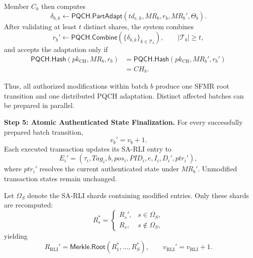 \documentclass[lettersize,journal]{IEEEtran}
\begin{document}
Member $C_k$ then computes
\begin{equation}
\delta_{b,k}
\leftarrow
\mathsf{PQCH.PartAdapt}
(td_{e,k},MR_b,r_b,MR_b',\Theta_b).
\end{equation}
After validating at least $t$ distinct shares, the system combines
\begin{equation}
r_b'
\leftarrow
\mathsf{PQCH.Combine}
(\{\delta_{b,k}\}_{k\in\mathcal{T}_b}),
\qquad
|\mathcal{T}_b|\geq t,
\end{equation}
and accepts the adaptation only if
\begin{equation}
\begin{aligned}
\mathsf{PQCH.Hash}(pk_{\mathrm{CH}},MR_b,r_b)
&=
\mathsf{PQCH.Hash}(pk_{\mathrm{CH}},MR_b',r_b')\\
&=CH_b.
\end{aligned}
\end{equation}

Thus, all authorized modifications within batch $b$ produce one SFMR
root transition and one distributed PQCH adaptation. Distinct affected
batches can be prepared in parallel.

\medskip
\noindent\textbf{Step 5: Atomic Authenticated State Finalization.}
For every successfully prepared batch transition,
\begin{equation}
v_b'=v_b+1.
\end{equation}
Each executed transaction updates its SA-RLI entry to
\begin{equation}
E_i'
=
(\tau_i,Tag_i,b,pos_i,PID_i,e,I_i,D_i',ptr_i'),
\end{equation}
where $ptr_i'$ resolves the current authenticated state under $MR_b'$.
Unmodified transaction states remain unchanged.

Let $\Omega_S$ denote the SA-RLI shards containing modified entries.
Only these shards are recomputed:
\begin{equation}
R_s^{*}=
\begin{cases}
R_s', & s\in\Omega_S,\\
R_s,  & s\notin\Omega_S,
\end{cases}
\end{equation}
yielding
\begin{equation}
R_{\mathrm{RLI}}'
=
\mathsf{Merkle.Root}(R_1^{*},\ldots,R_S^{*}),
\qquad
v_{\mathrm{RLI}}'=v_{\mathrm{RLI}}+1.
\end{equation}
\end{document}
